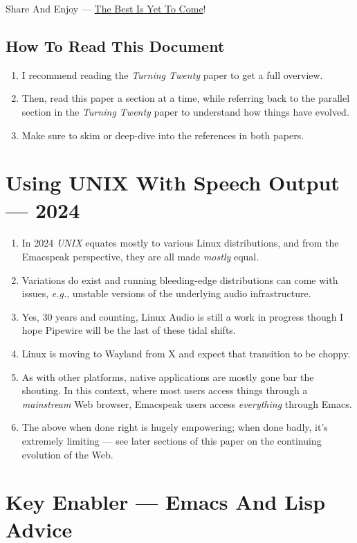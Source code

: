 \documentclass[11pt]{article}
\begin{document}
Share And Enjoy --- \href{https://tvraman.github.io/emacspeak/web/01-gemini.ogg}{The Best Is Yet To Come}!
\subsection{How To Read This Document}
\label{sec:org3830b3c}

\begin{enumerate}
\item I recommend reading the \emph{Turning Twenty} paper to get a full overview.
\item Then, read this paper a section at a time, while referring back to
the parallel section in the \emph{Turning Twenty} paper to understand
how things have evolved.
\item Make sure to skim or deep-dive into the references in both papers.
\end{enumerate}
\section{Using UNIX With Speech Output —  2024}
\label{sec:org4bb3c0f}

\begin{enumerate}
\item In 2024 \emph{UNIX} equates mostly to various Linux distributions, and from
the Emacspeak perspective, they are all made \emph{mostly} equal.
\item Variations do exist and  running bleeding-edge distributions can come
with issues, \emph{e.g.}, unstable versions of the underlying audio infrastructure.
\item Yes, 30 years and counting, Linux Audio is still a work in
progress though I hope Pipewire will be the last of these tidal shifts.
\item Linux is moving to Wayland from X and expect that transition to
be choppy.
\item As with other platforms, native applications are mostly gone bar
the shouting. In this context, where most users access things
through a \emph{mainstream} Web browser, Emacspeak users access
\emph{everything} through Emacs.
\item The above when  done right is hugely empowering; 
 when done badly, it's extremely limiting  --- see later
sections of this paper on  the continuing evolution of the Web.
\end{enumerate}
\section{Key Enabler — Emacs And Lisp Advice}
\label{sec:orgba9b51e}
\end{document}
